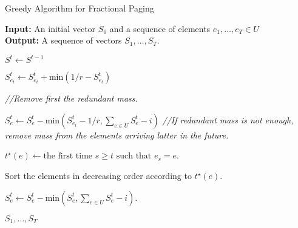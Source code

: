 \begin{algorithm}[H]
  \caption{Greedy Algorithm for Fractional Paging}\label{alg:greedy_paging}
  \textbf{Input:} An initial vector $S_0$ and a sequence of elements $e_1,\ldots,e_T \in U$\\
  \textbf{Output:} A sequence of vectors $S_1,\ldots,S_T$.

 \begin{algorithmic}[1]
        
        \STATE $S^t \leftarrow S^{t-1}$
        
        \STATE $S^t_{e_t} \leftarrow S^t_{e_t} + \text{min} \left( 1/r  - S_{e_t}^t\right)$
        
        \STATE \emph{//Remove first the redundant mass.}
        
            \STATE $S_e^t \leftarrow S_e^t - \text{min}\left( S_{e_t}^t - 1/r , 
            \sum_{e \in U}S_e^t - i
            \right)$
        \ENDIF    
        \STATE \emph{//If redundant mass is not enough, remove mass from the elements arriving latter in the future.}
        
        \STATE $t^\star(e) \leftarrow \text{the first time } s\geq t \text{ such that } e_s = e$.
        
        \STATE Sort the elements in decreasing order according to $t^\star(e)$.
        
        
        \STATE $S_e^t \leftarrow S_e^t - \text{min}(S_e^t, \sum_{e \in U} S_e^t - i)$.
        \ENDFOR
        
        \ENDFOR

        \ENDFOR
        
        \RETURN $S_1,\ldots,S_T$
  \end{algorithmic}
\end{algorithm}

